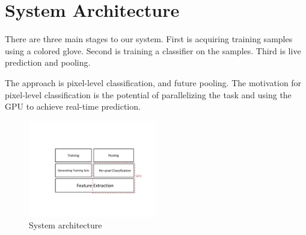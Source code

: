 \section{System Architecture}

There are three main stages to our system. First is acquiring training samples using a colored glove. Second is training a classifier on the samples. Third is live prediction and pooling. 

The approach is pixel-level classification, and future pooling. The motivation for pixel-level classification is the potential of parallelizing the task and using the GPU to achieve real-time prediction. 

\begin{figure}
\centering
	\includegraphics[width=0.5\textwidth]{fig/SystemArchitecture.pdf}
	\caption{System architecture}
\label{fig: architecture}
\end{figure}